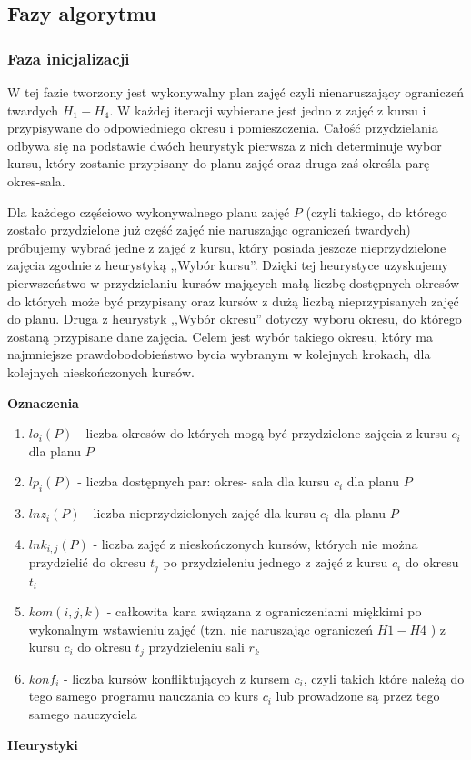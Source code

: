 \subsection{Fazy algorytmu}
\subsubsection{Faza inicjalizacji}
\par W tej fazie tworzony jest wykonywalny plan zajęć czyli nienaruszający ograniczeń twardych ${H_{1} - H_{4}}$. W każdej iteracji wybierane jest jedno z zajęć z kursu i przypisywane do odpowiedniego okresu i pomieszczenia. Całość przydzielania odbywa się na podstawie dwóch heurystyk pierwsza z nich determinuje wybor kursu, który zostanie przypisany do planu zajęć oraz druga zaś określa parę okres-sala.
\par Dla każdego częściowo wykonywalnego planu zajęć ${P}$ (czyli takiego, do którego zostało przydzielone już część zajęć nie naruszając ograniczeń twardych) próbujemy wybrać jedne z zajęć z kursu, który posiada jeszcze nieprzydzielone zajęcia zgodnie z heurystyką ,,Wybór kursu''. Dzięki tej heurystyce uzyskujemy pierwszeństwo w przydzielaniu kursów mających małą liczbę dostępnych okresów do których może być przypisany oraz kursów z dużą liczbą nieprzypisanych zajęć do planu. Druga z heurystyk ,,Wybór okresu'' dotyczy wyboru okresu, do którego zostaną przypisane dane zajęcia. Celem jest wybór takiego okresu, który ma najmniejsze prawdobodobieństwo bycia wybranym w kolejnych krokach, dla kolejnych nieskończonych kursów.

\par \textbf{Oznaczenia}
\begin{enumerate}
\item $ lo_{i}(P)$ - liczba okresów do których mogą być przydzielone zajęcia z kursu $c_{i}$ dla planu ${P}$
\item $ lp_{i}(P)$ - liczba dostępnych par: okres- sala dla kursu ${c_{i}}$ dla planu ${P}$
\item $ lnz_{i}(P)$ - liczba nieprzydzielonych zajęć dla kursu ${c_{i}}$ dla planu ${P}$
\item $ lnk_{i, j}(P)$ - liczba zajęć z nieskończonych kursów, których nie można przydzielić do okresu ${t_{j}}$ po przydzieleniu jednego z zajęć z kursu ${c_{i}}$ do okresu ${t_{i}}$
\item $kom(i, j, k)$ - całkowita kara związana z ograniczeniami miękkimi po wykonalnym wstawieniu zajęć (tzn. nie naruszając ograniczeń $H1 - H4$ ) z kursu $c_{i}$ do okresu ${t_{j}}$ przydzieleniu sali ${r_{k}}$
\item $konf_{i}$ - liczba kursów konfliktujących z kursem $c_{i}$, czyli takich które należą do tego samego programu nauczania co kurs $c_{i}$ lub prowadzone są przez tego samego nauczyciela
\end{enumerate}
\par \textbf{Heurystyki}

